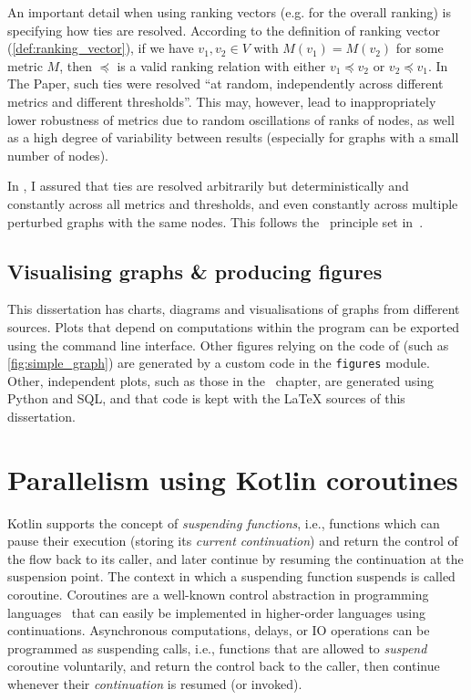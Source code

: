An important detail when using ranking vectors (e.g. for the overall ranking) is specifying how ties are resolved.
According to the definition of ranking vector (\cref{def:ranking_vector}), if we have $v_1, v_2 \in V$ with $M(v_1) = M(v_2)$ for some metric $M$, then $\preceq$ is a valid ranking relation with either $v_1 \preceq v_2$ or $v_2 \preceq v_1$.
In The Paper, such ties were resolved \enquote{at random, independently across different metrics and different thresholds}.
This may, however, lead to inappropriately lower robustness of metrics due to random oscillations of ranks of nodes, as well as a high degree of variability between results (especially for graphs with a small number of nodes).

In \graffs, I assured that ties are resolved arbitrarily but deterministically and constantly across all metrics and thresholds, and even constantly across multiple perturbed graphs with the same nodes.
This follows the~ principle set in~.

\subsection{Visualising graphs \& producing figures}

This dissertation has charts, diagrams and visualisations of graphs from different sources.
Plots that depend on computations within the \graffs program can be exported using the command line interface.
Other figures relying on the code of \graffs (such as \cref{fig:simple_graph}) are generated by a custom code in the \texttt{figures} module.
Other, independent plots, such as those in the~ chapter, are generated using Python and SQL, and that code is kept with the LaTeX sources of this dissertation.


\section{Parallelism using Kotlin coroutines}\label{sec:kotlin_coroutines}

Kotlin supports the concept of \textsl{suspending functions}, i.e., functions which can pause their execution (storing its \textsl{current continuation}) and return the control of the flow back to its caller, and later continue by resuming the continuation at the suspension point.
The context in which a suspending function suspends is called coroutine.
Coroutines are a well-known control abstraction in programming languages~\cite{MouraRevisitingCoroutines2009} that can easily be implemented in higher-order languages using continuations\cite{HaynesContinuationsCoroutines1984}.
Asynchronous computations, delays, or IO operations can be programmed as suspending calls, i.e., functions that are allowed to \textsl{suspend} coroutine voluntarily, and return the control back to the caller, then continue whenever their \textsl{continuation} is resumed (or invoked).


